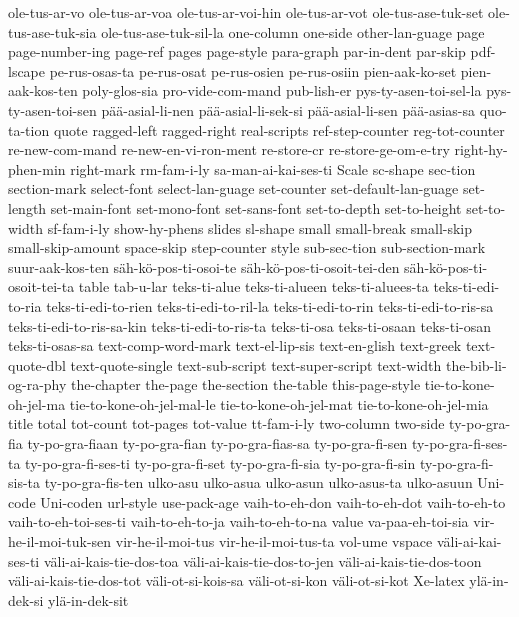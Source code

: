 {  ole-tus-ar-vo
  ole-tus-ar-voa
  ole-tus-ar-voi-hin
  ole-tus-ar-vot
  ole-tus-ase-tuk-set
  ole-tus-ase-tuk-sia
  ole-tus-ase-tuk-sil-la
  one-column
  one-side
  other-lan-guage
  page
  page-number-ing
  page-ref
  pages
  page-style
  para-graph
  par-in-dent
  par-skip
  pdf-lscape
  pe-rus-osas-ta
  pe-rus-osat
  pe-rus-osien
  pe-rus-osiin
  pien-aak-ko-set
  pien-aak-kos-ten
  poly-glos-sia
  pro-vide-com-mand
  pub-lish-er
  pys-ty-asen-toi-sel-la
  pys-ty-asen-toi-sen
  pää-asial-li-nen
  pää-asial-li-sek-si
  pää-asial-li-sen
  pää-asias-sa
  quo-ta-tion
  quote
  ragged-left
  ragged-right
  real-scripts
  ref-step-counter
  reg-tot-counter
  re-new-com-mand
  re-new-en-vi-ron-ment
  re-store-cr
  re-store-ge-om-e-try
  right-hy-phen-min
  right-mark
  rm-fam-i-ly
  sa-man-ai-kai-ses-ti
  Scale
  sc-shape
  sec-tion
  section-mark
  select-font
  select-lan-guage
  set-counter
  set-default-lan-guage
  set-length
  set-main-font
  set-mono-font
  set-sans-font
  set-to-depth
  set-to-height
  set-to-width
  sf-fam-i-ly
  show-hy-phens
  slides
  sl-shape
  small
  small-break
  small-skip
  small-skip-amount
  space-skip
  step-counter
  style
  sub-sec-tion
  sub-section-mark
  suur-aak-kos-ten
  säh-kö-pos-ti-osoi-te
  säh-kö-pos-ti-osoit-tei-den
  säh-kö-pos-ti-osoit-tei-ta
  table
  tab-u-lar
  teks-ti-alue
  teks-ti-alueen
  teks-ti-aluees-ta
  teks-ti-edi-to-ria
  teks-ti-edi-to-rien
  teks-ti-edi-to-ril-la
  teks-ti-edi-to-rin
  teks-ti-edi-to-ris-sa
  teks-ti-edi-to-ris-sa-kin
  teks-ti-edi-to-ris-ta
  teks-ti-osa
  teks-ti-osaan
  teks-ti-osan
  teks-ti-osas-sa
  text-comp-word-mark
  text-el-lip-sis
  text-en-glish
  text-greek
  text-quote-dbl
  text-quote-single
  text-sub-script
  text-super-script
  text-width
  the-bib-li-og-ra-phy
  the-chapter
  the-page
  the-section
  the-table
  this-page-style
  tie-to-kone-oh-jel-ma
  tie-to-kone-oh-jel-mal-le
  tie-to-kone-oh-jel-mat
  tie-to-kone-oh-jel-mia
  title
  total
  tot-count
  tot-pages
  tot-value
  tt-fam-i-ly
  two-column
  two-side
  ty-po-gra-fia
  ty-po-gra-fiaan
  ty-po-gra-fian
  ty-po-gra-fias-sa
  ty-po-gra-fi-sen
  ty-po-gra-fi-ses-ta
  ty-po-gra-fi-ses-ti
  ty-po-gra-fi-set
  ty-po-gra-fi-sia
  ty-po-gra-fi-sin
  ty-po-gra-fi-sis-ta
  ty-po-gra-fis-ten
  ulko-asu
  ulko-asua
  ulko-asun
  ulko-asus-ta
  ulko-asuun
  Uni-code
  Uni-coden
  url-style
  use-pack-age
  vaih-to-eh-don
  vaih-to-eh-dot
  vaih-to-eh-to
  vaih-to-eh-toi-ses-ti
  vaih-to-eh-to-ja
  vaih-to-eh-to-na
  value
  va-paa-eh-toi-sia
  vir-he-il-moi-tuk-sen
  vir-he-il-moi-tus
  vir-he-il-moi-tus-ta
  vol-ume
  vspace
  väli-ai-kai-ses-ti
  väli-ai-kais-tie-dos-toa
  väli-ai-kais-tie-dos-to-jen
  väli-ai-kais-tie-dos-toon
  väli-ai-kais-tie-dos-tot
  väli-ot-si-kois-sa
  väli-ot-si-kon
  väli-ot-si-kot
  Xe-latex
  ylä-in-dek-si
  ylä-in-dek-sit
}
